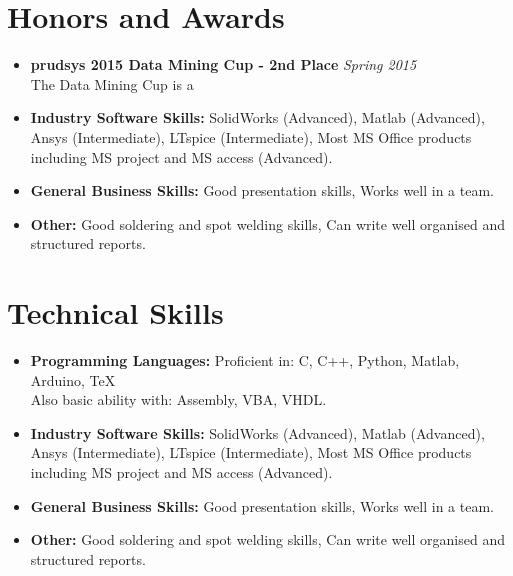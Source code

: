 \documentclass[11pt,a4paper,sans]{moderncv}        %
\begin{document}
\section{Honors and Awards}

\vspace{6pt}

\begin{itemize}

  \item \textbf{prudsys 2015 Data Mining Cup - 2nd Place} \hfill \emph{Spring 2015} \\ 
  The Data Mining Cup is a 

  \vspace{6pt}

\item \textbf{Industry Software Skills:} SolidWorks (Advanced), Matlab (Advanced), Ansys (Intermediate),  LTspice (Intermediate), Most MS Office products including MS project and MS access (Advanced).

\vspace{6pt}

\item \textbf{General Business Skills:} Good presentation skills, Works well in a team.

\vspace{6pt}

\item \textbf{Other:} Good soldering and spot welding skills, Can write well organised and structured reports.

\end{itemize}

\section{Technical Skills}

\vspace{6pt}

\begin{itemize}

\item \textbf{Programming Languages:} Proficient in: C, C++, Python, Matlab, Arduino, TeX \\ Also basic ability with: Assembly, VBA, VHDL.

\vspace{6pt}

\item \textbf{Industry Software Skills:} SolidWorks (Advanced), Matlab (Advanced), Ansys (Intermediate),  LTspice (Intermediate), Most MS Office products including MS project and MS access (Advanced).

\vspace{6pt}

\item \textbf{General Business Skills:} Good presentation skills, Works well in a team.

\vspace{6pt}

\item \textbf{Other:} Good soldering and spot welding skills, Can write well organised and structured reports.

\end{itemize}
\end{document}
